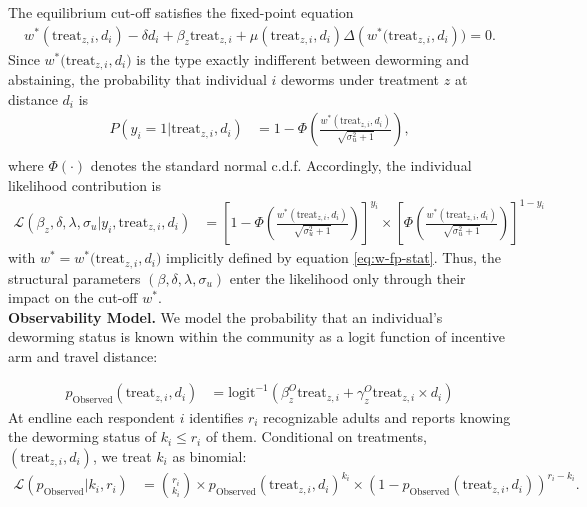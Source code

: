 \documentclass[12pt,a4paper]{article}
\begin{document}
The equilibrium cut-off satisfies the fixed-point equation
\begin{align}
    w^\ast(\textrm{treat}_{z,i}, d_i) - \delta d_i + \beta_z \textrm{treat}_{z,i} + \mu(\textrm{treat}_{z,i}, d_i) \Delta \left( w^\ast(\textrm{treat}_{z,i}, d_i\right)) = 0.
    \label{eq:w-fp-stat}
\end{align}
Since \(w^{\ast}\bigl(\text{treat}_{z,i},d_i\bigr)\) is the type exactly indifferent between deworming and abstaining, the probability that individual \(i\) deworms under treatment \(z\) at distance \(d_i\) is 
\begin{align*}
    P(y_i = 1 | \textrm{treat}_{z,i}, d_i) &= 1 - \Phi\left(\frac{w^\ast(\textrm{treat}_{z,i}, d_i)}{\sqrt{ \sigma_u^2 + 1}}\right), \\
\end{align*}
where \(\Phi(\cdot)\) denotes the standard normal c.d.f. Accordingly, the individual likelihood contribution is  
 \begin{align*}   
    \mathcal{L}(\beta_z, \delta, \lambda, \sigma_u | 
    y_i,
    \textrm{treat}_{z,i}, d_i) &= \left[1 - \Phi\left(\frac{w^\ast(\textrm{treat}_{z,i}, d_i)}{\sqrt{ \sigma_u^2 + 1}}\right)\right]^{y_i} \times \left[
    \Phi\left(\frac{w^\ast(\textrm{treat}_{z,i}, d_i)}{\sqrt{ \sigma_u^2 + 1}}\right)
    \right]^{1 - y_i}
    \label{eq:lh-takeup}
\end{align*}
with \(w^{\ast}=w^{\ast}\bigl(\text{treat}_{z,i},d_i\bigr)\) implicitly defined by equation \eqref{eq:w-fp-stat}. Thus, the structural parameters \((\beta,\delta,\lambda,\sigma_u)\) enter the likelihood only through their impact on the cut-off \(w^{\ast}\).\\

\textbf{Observability Model.} We model the probability that an individual’s deworming status is known within the community as a logit function of incentive arm and travel distance:

\begin{align*}
    {p_{\textrm{Observed}}(\textrm{treat}_{z,i}, d_i)} &= \textrm{logit}^{-1}\left(\beta^O_z \textrm{treat}_{z,i} + \gamma_z^O \textrm{treat}_{z,i} \times d_i\right)  
\end{align*}
At endline each respondent \(i\) identifies \(r_i\) recognizable adults and reports knowing the deworming status of \(k_i\le r_i\) of them. Conditional on treatments, \((\text{treat}_{z,i},d_i)\), we treat \(k_i\) as binomial:
\begin{align*}    
    \mathcal{L}(p_{\textrm{Observed}} | k_i, r_i) &= \binom{r_i}{k_i} \times p_{\textrm{Observed}}(\textrm{treat}_{z,i}, d_i)^{k_i} \times ( 1 - p_{\textrm{Observed}}(\textrm{treat}_{z,i}, d_i))^{r_i-k_i}. 
    \label{eq:binom-likelihood} 
\end{align*}
\end{document}
